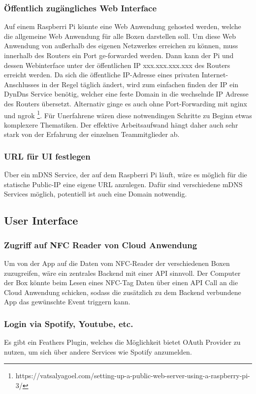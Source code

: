 \documentclass[10pt, a4paper, draft]{article}
\begin{document}
\subsubsection{Öffentlich zugängliches Web Interface}
Auf einem Raspberri Pi könnte eine Web Anwendung gehosted werden, welche die allgemeine Web Anwendung für alle Boxen darstellen soll.
Um diese Web Anwendung von außerhalb des eigenen Netzwerkes erreichen zu können, muss innerhalb des Routers ein Port ge-forwarded werden.
Dann kann der Pi und dessen Webinterface unter der öffentlichen IP xxx.xxx.xxx.xxx des Routers erreicht werden.
Da sich die öffentliche IP-Adresse eines privaten Internet-Anschlusses in der Regel täglich ändert, wird zum einfachen finden der IP ein DynDns Service benötig, welcher eine feste Domain in die wechselnde IP Adresse des Routers übersetzt.
Alternativ ginge es auch ohne Port-Forwarding mit nginx und ngrok \footnote{https://vatsalyagoel.com/setting-up-a-public-web-server-using-a-raspberry-pi-3/}.
Für Unerfahrene wären diese notwendingen Schritte zu Beginn etwas komplexere Thematiken. Der effektive Arbeitsaufwand hängt daher auch sehr stark von der Erfahrung der einzelnen Teammitglieder ab.

\subsubsection{URL für UI festlegen}
Über ein mDNS Service, der auf dem Raspberri Pi läuft, wäre es möglich für die statische Public-IP eine eigene URL anzulegen.
Dafür sind verschiedene mDNS Services möglich, potentiell ist auch eine Domain notwendig.

\subsection{User Interface}
\subsubsection{Zugriff auf NFC Reader von Cloud Anwendung}
Um von der App auf die Daten vom NFC-Reader der verschiedenen Boxen zuzugreifen, wäre ein zentrales Backend mit einer API sinnvoll.
Der Computer der Box könnte beim Lesen eines NFC-Tag Daten über einen API Call an die Cloud Anwendung schicken, sodass die zusätzlich zu dem Backend verbundene App das gewünschte Event triggern kann.

\subsubsection{Login via Spotify, Youtube, etc.}
Es gibt ein Feathers Plugin, welches die Möglichkeit bietet OAuth Provider zu nutzen, um sich über andere Services wie Spotify anzumelden.
\end{document}
